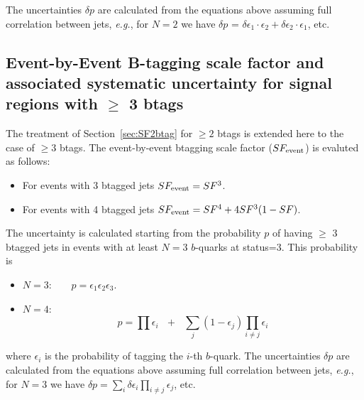 The uncertainties $\delta p$ are calculated from the equations above assuming full 
correlation between jets, {\em e.g.}, for $N=2$ we have 
$\delta p$ = $\delta \epsilon_1 \cdot \epsilon_2 + \delta \epsilon_2 \cdot \epsilon_1$, etc.


\subsection{Event-by-Event B-tagging scale factor and 
associated systematic uncertainty for signal regions with $\geq$ 3 btags}
\label{sec:SF3btag}
The treatment of Section~\ref{sec:SF2btag} for $\geq 2$ btags
is extended here to the case of $\geq 3$ btags.  
The event-by-event btagging scale factor ($SF_{\rm event}$) is evaluted
as follows:

\begin{itemize}
\item For events with 3 btagged jets $SF_{\rm event}=SF^3$.

\item For events with 4 btagged jets 
$SF_{\rm event}=SF^4 + 4SF^3(1-SF)$.

\end{itemize}

The uncertainty is calculated starting from the probability $p$ 
of having $\geq$ 3 btagged jets in events with at least $N=3$ $b$-quarks
at status=3.  This probability is

\begin{itemize}

\item $N = 3$:~~~~$p = \epsilon_1 \epsilon_2 \epsilon_3$.

\item $N = 4$:~~~~$$p = \prod{\epsilon_i}~~~+~~~\sum_j{(1-\epsilon_j)\prod_{i \ne j}{\epsilon_i}}$$

\end{itemize}

\noindent where $\epsilon_i$ is the probability of tagging the $i$-th $b$-quark.
The uncertainties $\delta p$ are calculated from the equations above assuming full 
correlation between jets, {\em e.g.}, for $N=3$ we have 
$\delta p = \sum_{i} \delta \epsilon_i \prod_{i \neq j} \epsilon_j$, etc.